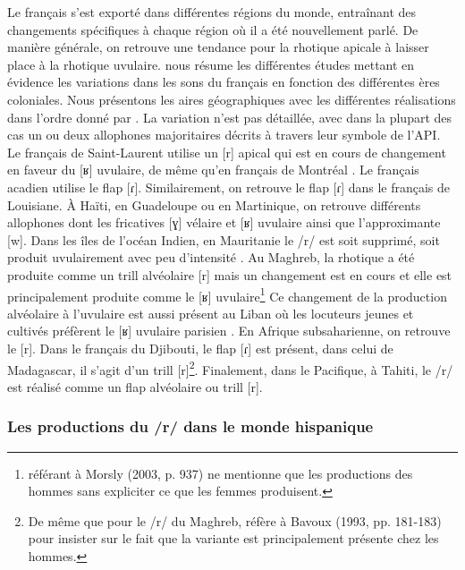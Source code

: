 Le français s'est exporté dans différentes régions du monde, entraînant des changements spécifiques à chaque région où il a été nouvellement parlé. De manière générale, on retrouve une tendance pour la rhotique apicale à laisser place à la rhotique uvulaire. \textcite{thibaultFrenchOutsideEurope2022} nous résume les différentes études mettant en évidence les variations dans les sons du français en fonction des différentes ères coloniales. Nous présentons les aires géographiques avec les différentes réalisations dans l'ordre donné par \citeauthor{thibaultFrenchOutsideEurope2022}. La variation n'est pas détaillée, avec dans la plupart des cas un ou deux allophones majoritaires décrits à travers leur symbole de l'API.\\

Le français de Saint-Laurent utilise un [r] apical qui est en cours de changement en faveur du [ʁ] uvulaire, de même qu'en français de Montréal \parencite{sankoffInstabilityAlternationMontreal2013,morinApicalUvularWhat2013}.
Le français acadien utilise le flap [ɾ]. Similairement, on retrouve le flap [ɾ] dans le français de Louisiane. À Haïti, en Guadeloupe ou en Martinique, on retrouve différents allophones dont les fricatives [ɣ] vélaire et [ʁ] uvulaire ainsi que l'approximante [w].
Dans les îles de l'océan Indien, en Mauritanie le /r/ est soit supprimé, soit produit uvulairement avec peu d'intensité \parencite[263--264]{ledegenFrenchMauritiusSpeaker2016}.
Au Maghreb, la rhotique a été produite comme un trill alvéolaire [r] mais un changement est en cours et elle est principalement produite comme le [ʁ] uvulaire\footnote{\textcite{thibaultFrenchOutsideEurope2022} référant à Morsly (2003, p. 937) ne mentionne que les productions des hommes sans expliciter ce que les femmes produisent.} Ce changement de la production alvéolaire à l'uvulaire est aussi présent au Liban où les locuteurs jeunes et cultivés préfèrent le [ʁ] uvulaire parisien \parencite[25]{thibaultFrenchOutsideEurope2022}. En Afrique subsaharienne, on retrouve le [r]. 
Dans le français du Djibouti, le flap [ɾ] est présent, dans celui de Madagascar, il s'agit d'un trill [r]\footnote{De même que pour le /r/ du Maghreb, \textcite{thibaultFrenchOutsideEurope2022} réfère à Bavoux (1993, pp. 181-183) pour insister sur le fait que la variante est principalement présente chez les hommes.}. 
Finalement, dans le Pacifique, à Tahiti, le /r/ est réalisé comme un flap alvéolaire ou trill [r].

\subsubsection{Les productions du /r/ dans le monde hispanique}

